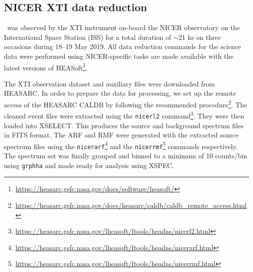     \subsection{NICER XTI data reduction}
    	\source\ was observed by the XTI instrument on-board the NICER observatory on the International Space Station (ISS) for a total duration of $\sim 21$ ks on three occasions during 18--19 May 2019. All data reduction commands for the science data were performed using NICER-specific tasks are made available with the latest versions of HEASoft\footnote{\url{https://heasarc.gsfc.nasa.gov/docs/software/heasoft/}}.
    	
    	The XTI observation dataset and auxiliary files were downloaded from HEASARC. In order to prepare the data for processing, we set up the remote access of the HEASARC CALDB by following the recommended procedure\footnote{\url{https://heasarc.gsfc.nasa.gov/docs/heasarc/caldb/caldb_remote_access.html}}. The cleaned event files were extracted using the \texttt{nicerl2} command\footnote{\url{https://heasarc.gsfc.nasa.gov/lheasoft/ftools/headas/nicerl2.html}}. They were then loaded into XSELECT. This produces the source and background spectrum files in FITS format. The ARF and RMF were generated with the extracted source spectrum files using the \texttt{nicerarf}\footnote{\url{https://heasarc.gsfc.nasa.gov/lheasoft/ftools/headas/nicerarf.html}} and the \texttt{nicerrmf}\footnote{\url{https://heasarc.gsfc.nasa.gov/lheasoft/ftools/headas/nicerrmf.html}} commands respectively. The spectrum set was finally grouped and binned to a minimum of 10 counts/bin using \texttt{grphha} and made ready for analysis using XSPEC.